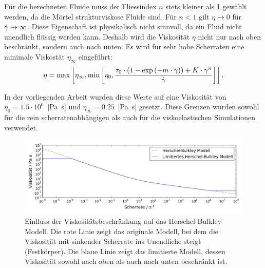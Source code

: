 Für die berechneten Fluide muss der Fliessindex $n$ stets kleiner als 1 gewählt werden, da die Mörtel strukturviskose Fluide sind.
Für $n<1$ gilt $\eta\rightarrow0$ für $\dot\gamma\rightarrow\infty$. Diese Eigenschaft ist physikalisch nicht sinnvoll, da ein Fluid nicht unendlich flüssig werden kann. Deshalb wird die Viskosität $\eta$ nicht nur nach oben beschränkt, sondern auch nach unten.
Es wird für sehr hohe Scherraten eine minimale Viskostät $\eta_\infty$ eingeführt:
%
\begin{equation}
    \eta = \max \left[ \eta_\infty, \min \left[ \eta_0, \frac{\tau_0\cdot\left(1-\exp\left( -m\cdot\dot\gamma \right)\right)+K\cdot \dot\gamma^n}{\dot\gamma} \right]\right].
\end{equation}
%

In der vorliegenden Arbeit wurden diese Werte auf eine Viskosität von $\eta_0=1.5\cdot10^6$~[Pa~s] und $\eta_\infty=0.25$~[Pa~s] gesetzt.
Diese Grenzen wurden sowohl für die rein scherratenabhängigen als auch für die viskoelastischen Simulationen verwendet.
%
\begin{figure}
    \centering
    \includegraphics[width=\textwidth]{figures/hbclamp.png}
    \caption{Einfluss der Viskositätsbeschränkung auf das Herschel-Bulkley Modell. Die rote Linie zeigt das originale Modell, bei dem die Viskosität mit sinkender Scherrate ins Unendliche steigt (Festkörper). Die blaue Linie zeigt das limitierte Modell, dessen Viskosität sowohl nach oben als auch nach unten beschränkt ist.}
    \label{fig:hbclamp}
\end{figure}
%
